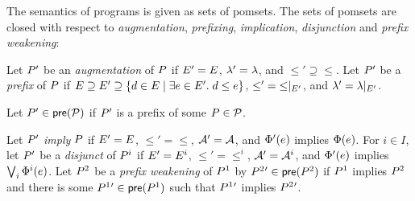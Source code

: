 The semantics of programs is given as sets of pomsets.  The sets of pomsets
are closed with respect to \emph{augmentation}, \emph{prefixing},
\emph{implication}, \emph{disjunction} and \emph{prefix weakening}:
\begin{definition}
  \label{def:closure:properties}
  Let
  $P'$ be an \emph{augmentation} of $P$ if $E'=E$,
  ${\lambda'}={\lambda}$, and ${\le'}\supseteq{\le}$. 
  Let
  $P'$ be a \emph{prefix} of $P$ if 
  $E \supseteq E' \supseteq \{ d \in E \mid \exists e\in E'.\; d\le e\}$,
  ${\le'}={\le}\mathbin{|}_{E'}$, and
  ${\lambda'}={\lambda}\mathbin{|}_{E'}$.  

  Let $P'\in\mathsf{pre}(\mathcal{P})$ if  $P'$ is a
  prefix of some $P \in \mathcal{P}$.
  
  Let
  $P'$ \emph{imply} $P$ if $E'=E$, ${\le'}={\le}$,
  $\mathcal{A}'=\mathcal{A}$, and $\Phi'(e)$
  implies $\Phi(e)$. 
  For $i\in I$, let $P'$ be a \emph{disjunct} of $P^i$ if
  $E' = E^i$, ${\le'}={\le^i}$, $\mathcal{A}'=\mathcal{A}^i$, and
  $\Phi'(e)$ implies $\bigvee_i \Phi^i(e)$.
  Let $P^{2}$ be a \emph{prefix weakening} of $P^1$ by
  $P^{2}{}'\in\mathsf{pre}(P^{2})$ if $P^1$ implies $P^{2}$ and there is
  some $P^{1}{}'\in\mathsf{pre}(P^{1})$ such that $P^{1}{}'$ implies
  $P^{2}{}'$.
\end{definition}

